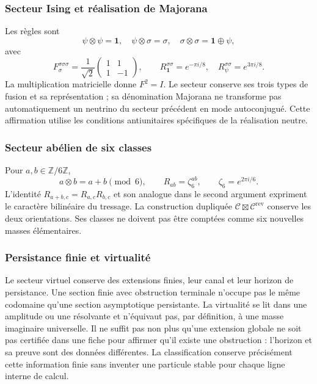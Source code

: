 \subsubsection{Secteur Ising et réalisation de Majorana}

Les règles sont
\[
 \psi\otimes\psi=\mathbf1,\quad
 \psi\otimes\sigma=\sigma,\quad
 \sigma\otimes\sigma=\mathbf1\oplus\psi,
\]
avec
\[
 F_\sigma^{\sigma\sigma\sigma}=\frac1{\sqrt2}
 \begin{pmatrix}1&1\\1&-1\end{pmatrix},\qquad
 R_{\mathbf1}^{\sigma\sigma}=e^{-\pi i/8},\quad
 R_\psi^{\sigma\sigma}=e^{3\pi i/8}.
\]
La multiplication matricielle donne \(F^2=I\). Le secteur conserve ses
trois types de fusion et sa représentation ; sa dénomination Majorana
ne transforme pas automatiquement un neutrino du secteur précédent en mode
autoconjugué. Cette affirmation utilise les conditions antiunitaires
spécifiques de la réalisation neutre.

\subsubsection{Secteur abélien de six classes}

Pour \(a,b\in\mathbb Z/6\mathbb Z\),
\[
 a\otimes b=a+b\pmod6,\qquad
 R_{ab}=\zeta_6^{ab},\qquad\zeta_6=e^{2\pi i/6}.
\]
L’identité \(R_{a+b,c}=R_{a,c}R_{b,c}\) et son analogue dans le
second argument expriment le caractère bilinéaire du tressage.
La construction dupliquée
\(\mathcal C\boxtimes\mathcal C^{\mathrm{rev}}\) conserve les deux
orientations. Ses classes ne doivent pas être comptées comme six nouvelles masses
élémentaires.

\subsubsection{Persistance finie et virtualité}

Le secteur virtuel conserve des extensions finies, leur canal et leur horizon
de persistance. Une section finie avec obstruction terminale n’occupe pas
le même codomaine qu’une section asymptotique persistante. La
virtualité se lit dans une amplitude ou une résolvante et n’équivaut pas, par
définition, à une masse imaginaire universelle. Il ne suffit pas non plus qu’une
extension globale ne soit pas certifiée dans une fiche pour affirmer qu’il
existe une obstruction : l’horizon et sa preuve sont des données différentes.
La classification conserve précisément cette information finie sans
inventer une particule stable pour chaque ligne interne de calcul.


